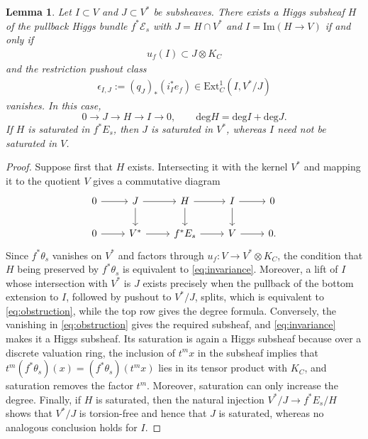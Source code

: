 \documentclass[oneside,11pt]{amsart}
\newtheorem{lem}[thm]{Lemma}
\theoremstyle{definition}
\theoremstyle{remark}
\numberwithin{thm}{section}
\numberwithin{equation}{section}
\begin{document}
\begin{lem}\label{lem:curve-criterion}
Let $I\subset V$ and $J\subset V^*$ be subsheaves.  There exists a Higgs
subsheaf $H$ of the pullback Higgs bundle $f^*\mathcal{E}_s$ with
$J=H\cap V^*$ and
$I=\mathrm{Im}(H\to V)$ if and only if
\begin{align}\label{eq:invariance}
 u_f(I)\subset J\otimes K_C
\end{align}
and the restriction pushout class
\begin{align}\label{eq:obstruction}
 \epsilon_{I,J}:=(q_J)_*(i_I^*e_f)\in\mathrm{Ext}^1_C(I,V^*/J)
\end{align}
vanishes.  In this case,
\[
 0\longrightarrow J\longrightarrow H\longrightarrow I
 \longrightarrow0,
 \qquad
 \mathrm{deg} H=\mathrm{deg} I+\mathrm{deg} J.
\]
If $H$ is saturated in $f^*E_s$, then $J$ is saturated in $V^*$, whereas
$I$ need not be saturated in $V$.
\end{lem}

\begin{proof}
Suppose first that $H$ exists.  Intersecting it with the kernel $V^*$ and
mapping it to the quotient $V$ gives a commutative diagram
\[
\begin{tikzcd}
0\arrow[r]&J\arrow[r]\arrow[d]&H\arrow[r]\arrow[d]
&I\arrow[r]\arrow[d]&0\\
0\arrow[r]&V^*\arrow[r]&f^*E_s\arrow[r]&V\arrow[r]&0.
\end{tikzcd}
\]
Since $f^*\theta_s$ vanishes on $V^*$ and factors through
$u_f:V\to V^*\otimes K_C$, the condition that $H$ being preserved by $f^*\theta_s$ is equivalent to \eqref{eq:invariance}. Moreover, a lift of $I$ whose intersection with $V^*$ is $J$ exists precisely when the pullback of the bottom extension to $I$, followed by pushout to $V^*/J$, splits, which is equivalent to \eqref{eq:obstruction}, while the top row gives the degree formula. Conversely, the vanishing in \eqref{eq:obstruction} gives the required subsheaf, and \eqref{eq:invariance} makes it a Higgs subsheaf.  Its saturation is again a Higgs subsheaf because over a discrete valuation ring, the inclusion of $t^mx$ in the subsheaf implies that $t^m(f^*\theta_s)(x)=(f^*\theta_s)(t^mx)$ lies in its tensor product with $K_C$, and saturation removes the factor $t^m$. Moreover, saturation can only increase the degree.  Finally, if $H$ is saturated, then the natural injection $V^*/J\longrightarrow f^*E_s/H$ shows that $V^*/J$ is
torsion-free and hence that $J$ is saturated, whereas no analogous conclusion holds for $I$.
\end{proof}
\end{document}
